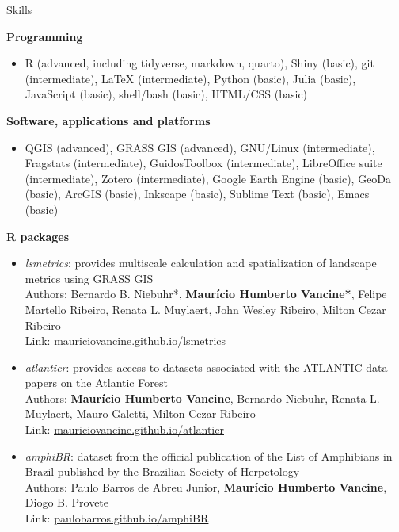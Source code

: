 \documentclass{resume}
\begin{document}
\begin{rSection}{Skills}

\textbf{Programming}
\begin{itemize}
\item R (advanced, including tidyverse, markdown, quarto), Shiny (basic), git (intermediate), LaTeX (intermediate), Python (basic), Julia (basic), JavaScript (basic), shell/bash (basic), HTML/CSS (basic)
\end{itemize}

\textbf{Software, applications and platforms}
\begin{itemize}
\item QGIS (advanced), GRASS GIS (advanced), GNU/Linux (intermediate), Fragstats (intermediate), GuidosToolbox (intermediate), LibreOffice suite (intermediate), Zotero (intermediate), Google Earth Engine (basic), GeoDa (basic), ArcGIS (basic), Inkscape (basic), Sublime Text (basic), Emacs (basic)
\end{itemize}

\textbf{R packages}
\begin{itemize} 
\item \textit{lsmetrics}: provides multiscale calculation and spatialization of landscape metrics using GRASS GIS\\
Authors: Bernardo B. Niebuhr*, \textbf{Maurício Humberto Vancine*}, Felipe Martello Ribeiro, Renata L. Muylaert, John Wesley Ribeiro, Milton Cezar Ribeiro\\
Link: \href{https://mauriciovancine.github.io/lsmetrics}{\underline{mauriciovancine.github.io/lsmetrics}}

\item \textit{atlanticr}: provides access to datasets associated with the ATLANTIC data papers on the Atlantic Forest\\
Authors: \textbf{Maurício Humberto Vancine}, Bernardo Niebuhr, Renata L. Muylaert, Mauro Galetti, Milton Cezar Ribeiro\\
Link: \href{https://mauriciovancine.github.io/atlanticr}{\underline{mauriciovancine.github.io/atlanticr}}

\item \textit{amphiBR}: dataset from the official publication of the List of Amphibians in Brazil published by the Brazilian Society of Herpetology\\
Authors: Paulo Barros de Abreu Junior, \textbf{Maurício Humberto Vancine}, Diogo B. Provete\\
Link: \href{https://paulobarros.github.io/amphiBR}{\underline{paulobarros.github.io/amphiBR}}


\end{itemize}
\end{rSection}
\end{document}
